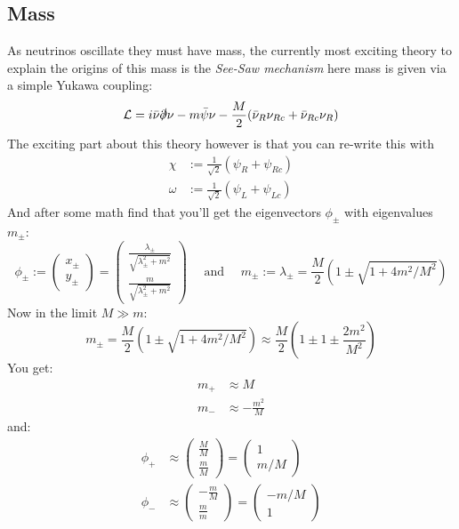 \documentclass[11pt,a4paper,faculty=we,language=en,doctype=report]{cls/ugent-doc}
\begin{document}
\subsection{Mass}
As neutrinos oscillate they must have mass, the currently most exciting theory to 
explain the origins of this mass is the \textit{See-Saw mechanism} here mass is given
via a simple Yukawa coupling:
\begin{equation}
	\mathcal{L} = i\bar{\nu}\slashed{\partial}\nu - m\bar{\psi}\nu - \frac{M}{2} (\bar{\nu}_R\nu_{Rc} + \bar{\nu}_{Rc}\nu_R)
\end{equation}
The exciting part about this theory however is that you can re-write this with
\begin{align}
	\chi &:= \frac{1}{\sqrt{2}} (\psi_R + \psi_{Rc})\\
	\omega &:= \frac{1}{\sqrt{2}} (\psi_L + \psi_{Lc})
\end{align}
And after some math find that you'll get the eigenvectors $\phi_\pm$ with eigenvalues $m_\pm$:
\begin{equation}
	\phi_\pm := \left(\begin{array}{c}
		x_\pm\\
		y_\pm
	\end{array}\right) = \left(\begin{array}{c}
		\frac{\lambda_\pm}{\sqrt{\lambda_\pm^2 + m^2}}\\
		\frac{m}{\sqrt{\lambda_\pm^2 + m^2}}
	\end{array}\right) \quad \text{ and }\quad m_\pm := \lambda_\pm =  \frac{M}{2}\left( 1 \pm \sqrt{1 + 4m^2/M^2}\right)
\end{equation}
Now in the limit $M \gg m$:
\begin{equation}
	m_\pm =  \frac{M}{2}\left( 1 \pm \sqrt{1 + 4m^2/M^2}\right) \approx \frac{M}{2}\left(1\pm1\pm\frac{2m^2}{M^2}\right)
\end{equation}
You get:
\begin{align}
	m_+ &\approx M\\
	m_- &\approx -\frac{m^2}{M}
\end{align}
and:
\begin{align}
	\phi_+&\approx \left(\begin{array}{c}
		\frac{M}{M}\\
		\frac{m}{M}
	\end{array}\right) = \left(\begin{array}{c}
	1\\
	m/M
	\end{array}\right)\\
	\phi_-&\approx \left(\begin{array}{c}
		-\frac{m}{M}\\
		\frac{m}{m}
	\end{array}\right) = \left(\begin{array}{c}
		-m/M\\
		1
	\end{array}\right)
\end{align}
\end{document}
